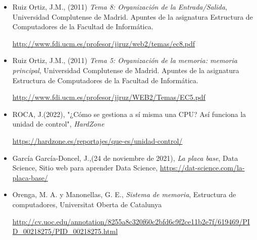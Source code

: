 \documentclass{book}
\begin{document}
\begin{large}

\begin{itemize}

    \item Ruiz Ortiz, J.M., (2011) \textit{Tema 8: Organización de la Entrada/Salida}, Universidad Complutense de Madrid. Apuntes de la asignatura Estructura de Computadores de la Facultad de Informática. 
    
    \url{http://www.fdi.ucm.es/profesor/jjruz/web2/temas/ec8.pdf }
    
    \item Ruiz Ortiz, J.M., (2011) \textit{Tema 5: Organización de la memoria: memoria principal}, Universidad Complutense de Madrid. Apuntes de la asignatura Estructura de Computadores de la Facultad de Informática. 
    
    \url{http://www.fdi.ucm.es/profesor/jjruz/WEB2/Temas/EC5.pdf}
    
    \item ROCA, J.(2022), "¿Cómo se gestiona a sí misma una CPU? Así funciona la unidad de control", \textit{HardZone}
    
    \url{https://hardzone.es/reportajes/que-es/unidad-control/}
    
    \item García García-Doncel, J.,(24 de noviembre de 2021), \textit{La placa base}, Data Science, Sitio web para aprender Data Science, \url{https://dat-science.com/la-placa-base/}
    
    \item  Orenga, M. A. y  Manonellas, G. E., \textit{Sistema de memoria}, Estructura de computadores, Universitat Oberta de Catalunya 
    
    \url{http://cv.uoc.edu/annotation/8255a8c320f60c2bfd6c9f2ce11b2e7f/619469/PID\_00218275/PID\_00218275.html}
    
\end{itemize}

\end{large}

\end{document}
